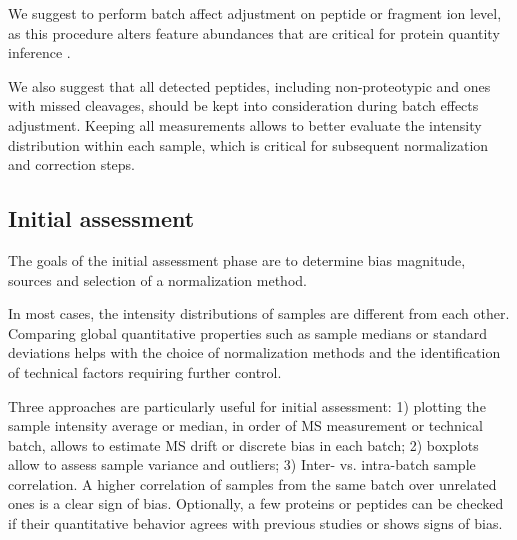 \documentclass[num-refs]{wiley-article}
\begin{document}
We suggest to perform batch affect adjustment on peptide or fragment ion level, as this procedure alters feature abundances that are critical for protein quantity inference \cite{Clough:2012aa, Teo:2015aa}.  


We also suggest that all detected peptides, including non-proteotypic and ones with missed cleavages, should be kept into consideration during batch effects adjustment. Keeping all measurements allows to better evaluate the intensity distribution within each sample, which is critical for subsequent normalization and correction steps.

\subsection{Initial assessment}
The goals of the initial assessment phase are to determine bias magnitude, sources and selection of a normalization method.

In most cases, the intensity distributions of samples are different from each other. Comparing global quantitative properties such as sample medians or standard deviations helps with the choice of normalization methods and the identification of technical factors requiring further control. 

Three approaches are particularly useful for initial assessment: 1) plotting the sample intensity average or median, in order of MS measurement or technical batch, allows to estimate MS drift or discrete bias in each batch; 2) boxplots allow to assess sample variance and outliers; 3) Inter- vs. intra-batch sample correlation. A higher correlation of samples from the same batch over unrelated ones is a clear sign of bias. Optionally, a few proteins or peptides can be checked if their quantitative behavior agrees with previous studies or shows signs of bias.
\end{document}
